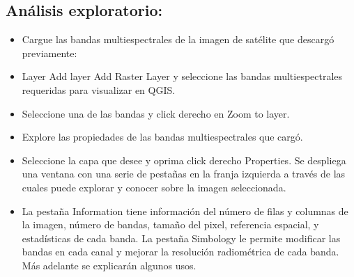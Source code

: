 \documentclass[a4paper,oneside,11pt,]{article}
\begin{document}
\subsection{Análisis exploratorio:}
\begin{itemize}
\item Cargue las bandas multiespectrales de la imagen de satélite que descargó previamente: 
\item Layer Add layer  Add Raster Layer y seleccione las bandas multiespectrales requeridas para visualizar en QGIS.
\item Seleccione una de las bandas y click derecho en Zoom to layer.
\item Explore las propiedades de las bandas multiespectrales que cargó. 
\item Seleccione la capa que desee y oprima click derecho Properties. Se despliega una ventana con una serie de pestañas en la franja izquierda a través de las cuales puede explorar y conocer sobre la imagen seleccionada. 
\item La pestaña Information tiene información del número de filas y columnas de la imagen, número de bandas, tamaño del pixel, referencia espacial, y estadísticas de cada banda. La pestaña Simbology le permite modificar las bandas en cada canal y mejorar la resolución radiométrica de cada banda. Más adelante se explicarán algunos usos.
\end{itemize}
\end{document}
